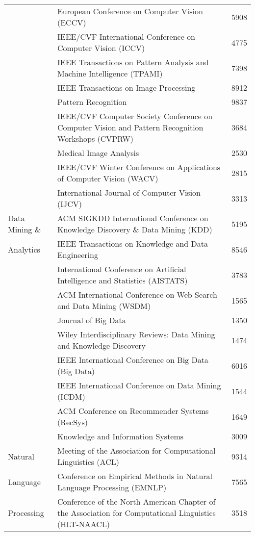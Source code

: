 {\begin{tabular}{p{2.5cm}lr}
         & European Conference on Computer Vision (ECCV) & 5908 \\
         & IEEE/CVF International Conference on Computer Vision (ICCV) & 4775 \\
         & IEEE Transactions on Pattern Analysis and Machine Intelligence (TPAMI) & 7398 \\
         & IEEE Transactions on Image Processing & 8912 \\
         & Pattern Recognition & 9837 \\
         & IEEE/CVF Computer Society Conference on Computer Vision and Pattern Recognition Workshops (CVPRW) & 3684 \\
         & Medical Image Analysis & 2530 \\
         & IEEE/CVF Winter Conference on Applications of Computer Vision (WACV) & 2815 \\
         & International Journal of Computer Vision (IJCV) & 3313 \\
        \hline
        Data Mining \& & ACM SIGKDD International Conference on Knowledge Discovery \& Data Mining (KDD) & 5195 \\
        Analytics & IEEE Transactions on Knowledge and Data Engineering & 8546 \\
         & International Conference on Artificial Intelligence and Statistics (AISTATS) & 3783 \\
         & ACM International Conference on Web Search and Data Mining (WSDM) & 1565 \\
         & Journal of Big Data & 1350 \\
         & Wiley Interdisciplinary Reviews: Data Mining and Knowledge Discovery & 1474 \\
         & IEEE International Conference on Big Data (Big Data) & 6016 \\
         & IEEE International Conference on Data Mining (ICDM) & 1544 \\
         & ACM Conference on Recommender Systems (RecSys) & 1649 \\
         & Knowledge and Information Systems & 3009 \\
        \hline
        Natural & Meeting of the Association for Computational Linguistics (ACL) & 9314 \\
        Language & Conference on Empirical Methods in Natural Language Processing (EMNLP) & 7565 \\
        Processing & Conference of the North American Chapter of the Association for Computational Linguistics (HLT-NAACL) & 3518 \\

\end{tabular}}
